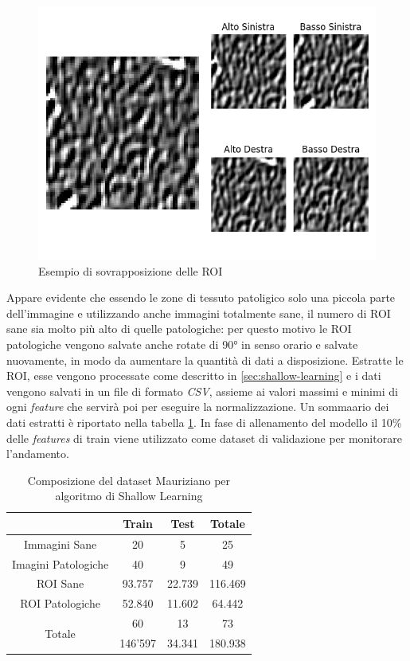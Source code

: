 \begin{figure}
    \includegraphics[width=\textwidth]{./assets/path-overlap.png}
    \caption{\label{fig:patch-overlap}Esempio di sovrapposizione delle ROI}
\end{figure}

Appare evidente che essendo le zone di tessuto patoligico solo
una piccola parte dell'immagine e utilizzando anche immagini
totalmente sane, il numero di ROI sane sia molto più alto di
quelle patologiche: per questo motivo le ROI patologiche
vengono salvate anche rotate di 90° in senso orario e salvate
nuovamente, in modo da aumentare la quantità di dati
a disposizione.
Estratte le ROI, esse vengono processate come descritto in
\ref{sec:shallow-learning} e i dati vengono salvati
in un file di formato {\it CSV}, assieme ai valori massimi
e minimi di ogni {\it feature} che servirà poi per eseguire
la normalizzazione.
Un sommaario dei dati estratti è riportato nella tabella
\ref{tab:mauriziano}.
In fase di allenamento del modello il 10\% delle
{\it features} di train viene utilizzato come
dataset di validazione per monitorare l'andamento.

\begin{table}
    \center
    \begin{tabular}[h]{||c||c|c|c||}
        \hline
        & Train & Test & Totale \\
        \hline
        Immagini Sane & 20 & 5 & 25 \\
        \hline
        Imagini Patologiche & 40 & 9 & 49 \\
        \hline
        ROI Sane & 93.757 & 22.739 & 116.469 \\
        \hline
        ROI Patologiche & 52.840 & 11.602 & 64.442 \\
        \hline
        \hline
        \multirow{2}{*}{Totale} & 60 & 13 & 73 \\ \cline{2-4}
        & 146'597 & 34.341 & 180.938 \\
        \hline
    \end{tabular}
    \caption{\label{tab:mauriziano}Composizione del dataset Mauriziano per
    algoritmo di Shallow Learning}
\end{table}

